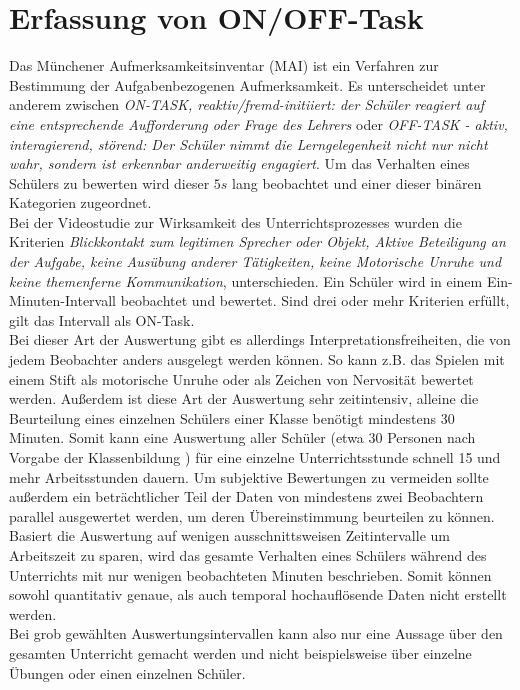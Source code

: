 \section{Erfassung von ON/OFF-Task}
\label{on_off_Task}
\glqq Das Münchener Aufmerksamkeitsinventar (MAI)\grqq \cite{MAI_Verhaltensbeobachtung} ist ein Verfahren zur Bestimmung der Aufgabenbezogenen Aufmerksamkeit. Es unterscheidet unter anderem zwischen \textit{\glqq ON-TASK, reaktiv/fremd-initiiert: der Schüler reagiert auf eine entsprechende Aufforderung oder Frage des Lehrers\grqq} oder \textit{\glqq OFF-TASK - aktiv, interagierend, störend: Der Schüler nimmt die Lerngelegenheit nicht nur nicht wahr, sondern ist erkennbar anderweitig engagiert\grqq}. Um das Verhalten eines Schülers zu bewerten wird dieser $5s$ lang beobachtet und einer dieser binären Kategorien zugeordnet.\\
Bei der \glqq Videostudie zur Wirksamkeit des Unterrichtsprozesses \grqq \cite{aufmerksamkeit_Studie} wurden die Kriterien \textit{\glqq Blickkontakt zum legitimen Sprecher oder Objekt, Aktive Beteiligung an der Aufgabe, keine Ausübung anderer Tätigkeiten, keine Motorische Unruhe und keine themenferne Kommunikation\grqq}, unterschieden. Ein Schüler wird in einem Ein-Minuten-Intervall beobachtet und bewertet. Sind drei oder mehr Kriterien erfüllt, gilt das Intervall als ON-Task.\\
Bei dieser Art der Auswertung gibt es allerdings Interpretationsfreiheiten, die von jedem Beobachter anders ausgelegt werden können. So kann z.B. das Spielen mit einem Stift als motorische Unruhe oder als Zeichen von Nervosität bewertet werden. Außerdem ist diese Art der Auswertung sehr zeitintensiv, alleine die Beurteilung eines einzelnen Schülers einer Klasse benötigt mindestens 30 Minuten. Somit kann eine Auswertung aller Schüler (etwa 30 Personen nach Vorgabe der Klassenbildung \cite{klassenteiler}) für eine einzelne Unterrichtsstunde schnell 15 und mehr Arbeitsstunden dauern. Um subjektive Bewertungen zu vermeiden sollte außerdem ein beträchtlicher Teil der Daten von mindestens zwei Beobachtern parallel ausgewertet werden, um deren Übereinstimmung beurteilen zu können.\\
Basiert die Auswertung auf wenigen ausschnittsweisen Zeitintervalle um Arbeitszeit zu sparen, wird das gesamte Verhalten eines Schülers während des Unterrichts mit nur wenigen beobachteten Minuten beschrieben. Somit können sowohl quantitativ genaue, als auch temporal hochauflösende Daten nicht erstellt werden.\\
Bei grob gewählten Auswertungsintervallen kann also nur eine Aussage über den gesamten Unterricht gemacht werden und nicht beispielsweise über einzelne Übungen oder einen einzelnen Schüler.